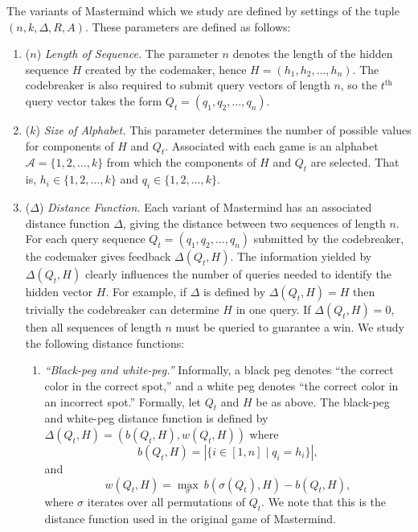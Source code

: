 \documentclass[12pt, a4paper]{article}
\newcommand{\nth}{^{\text{th}}}       %
\begin{document}
The variants of Mastermind which we study are defined by settings of the tuple $(n, k, \Delta, R, A)$. These parameters are defined as follows:
\begin{enumerate}[label=(\roman*)]
	\item ($n$) \textit{Length of Sequence.} The parameter $n$ denotes the length of the hidden sequence $H$ created by the codemaker, hence $H = (h_1, h_2, \ldots, h_n)$. The codebreaker is also required to submit query vectors of length $n$, so the $t\nth$ query vector takes the form $Q_t = (q_1, q_2, \ldots, q_n)$.
	
	\item ($k$) \textit{Size of Alphabet.} This parameter determines the number of possible values for components of $H$ and $Q_t$. Associated with each game is an alphabet $\mathcal{A} = \{1,2,\ldots,k\}$ from which the components of $H$ and $Q_t$ are selected. That is, $h_i\in\{1,2,\ldots,k\}$ and $q_i\in\{1,2,\ldots,k\}$.
	
	\item($\Delta$) \textit{Distance Function.} Each variant of Mastermind has an associated distance function $\Delta$, giving the distance between two sequences of length $n$. For each query sequence $Q_t = (q_1, q_2, \ldots, q_n)$ submitted by the codebreaker, the codemaker gives feedback $\Delta(Q_t, H)$. The information yielded by $\Delta(Q_t, H)$ clearly influences the number of queries needed to identify the hidden vector $H$. For example, if $\Delta$ is defined by $\Delta(Q_t, H) = H$ then trivially the codebreaker can determine $H$ in one query. If $\Delta(Q_t, H) = 0$, then all sequences of length $n$ must be queried to guarantee a win. We study the following distance functions:
	\begin{enumerate}[label=\alph*.]
		\item\textit{``Black-peg and white-peg.''} Informally, a black peg denotes ``the correct color in the correct spot,'' and a white peg denotes ``the correct color in an incorrect spot.'' Formally, let $Q_t$ and $H$ be as above. The black-peg and white-peg distance function is defined by $\Delta(Q_t, H) = (b(Q_t, H), w(Q_t, H))$ where
		\begin{equation}\label{blackHitsDefinition}
			b(Q_t, H) = \left|\{i\in [1,n] \mid q_i = h_i\}\right|,
		\end{equation}
		and
		\begin{equation*}\label{whiteHitsDefinition}
			w(Q_t, H) = \max_{\sigma}~b(\sigma(Q_t), H) - b(Q_t, H),
		\end{equation*}
		where $\sigma$ iterates over all permutations of $Q_t$. We note that this is the distance function used in the original game of Mastermind.


\end{enumerate}
\end{enumerate}
\end{document}
